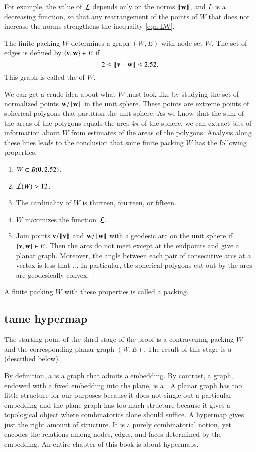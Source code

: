For example, the value of ${\mathcal L}$
depends only on the norms ${\hbox{\ensuremath{\hspace{0.1em}|\hspace{-0.1em}|\hspace{0.1em}}}{\mathbf w}\hbox{\ensuremath{\hspace{0.1em}|\hspace{-0.1em}|\hspace{0.1em}}}}$, and $L$ is a decreasing
function, so that any rearrangement of the points of $W$ that does not
increase the norms strengthens the inequality \eqref{eqn:LW}.

The finite packing $W$ determines a graph $(W,E)$ with node set $W$.  The set
of edges is defined by $\{{\mathbf v},{\mathbf w}\}\in E$ if 
\[2\le\norm{\v}{\w}\le 2.52.\] This graph is called the  of $W$.

We can get a crude idea about what $W$ must look like by studying the
set of normalized points ${\mathbf w}/{\hbox{\ensuremath{\hspace{0.1em}|\hspace{-0.1em}|\hspace{0.1em}}}{\mathbf w}\hbox{\ensuremath{\hspace{0.1em}|\hspace{-0.1em}|\hspace{0.1em}}}}$ in the unit sphere.  These
points are extreme points of spherical polygons that partition the unit sphere.
  As we know that the sum of the areas of the polygons equals
the area $4\pi$ of the sphere, we can extract bits of information
about $W$ from estimates of the areas of the polygons.  Analysis along
these lines leads to the conclusion that some finite packing $W$
has the following 
properties.
\begin{enumerate}\wasitemize 
\item $W\subset B({\mathbf 0},2.52)$.
\item ${\mathcal L}(W) > 12$.
\item The cardinality of $W$ is thirteen, fourteen, or fifteen.
\item $W$ maximizes the function ${\mathcal L}$.
\item Join points ${\mathbf v}/{\hbox{\ensuremath{\hspace{0.1em}|\hspace{-0.1em}|\hspace{0.1em}}}{\mathbf v}\hbox{\ensuremath{\hspace{0.1em}|\hspace{-0.1em}|\hspace{0.1em}}}}$ and ${\mathbf w}/{\hbox{\ensuremath{\hspace{0.1em}|\hspace{-0.1em}|\hspace{0.1em}}}{\mathbf w}\hbox{\ensuremath{\hspace{0.1em}|\hspace{-0.1em}|\hspace{0.1em}}}}$ with a geodesic arc on the
unit sphere if $\{{\mathbf v},{\mathbf w}\}\in E$.  Then the arcs do not meet except at the endpoints and
give a planar graph.  Moreover, the angle between each pair of consecutive arcs at a vertex is less
that $\pi$.  In particular, the spherical polygons cut out by the arcs are 
geodesically convex.
\end{enumerate}\wasitemize 
A finite packing $W$ with these properties is called a  packing.


\subsection{tame hypermap}

The starting point of the third stage of the proof is a contravening
packing $W$ and the corresponding planar graph $(W,E)$.  The result of
this stage is a  (described below).

By definition, a  is a graph that admits a
 embedding.  By contrast, a graph, endowed with
a fixed embedding into the plane, is a .  A
planar graph has too little structure for our purposes because it
does not single out a particular embedding and the plane graph has too
much structure because it gives a topological object where combinatorics
alone should suffice.  A hypermap gives just the right amount of
structure.  It is a purely combinatorial notion, yet encodes the
relations among nodes, edges, and faces determined by the embedding.
An entire chapter of this book is about hypermaps.


